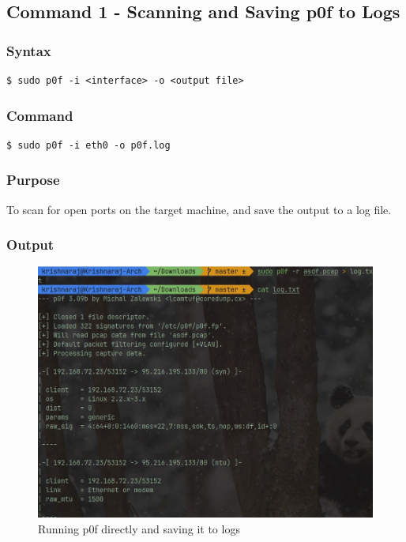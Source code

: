 \documentclass[11pt]{article}
\begin{document}
\subsection{Command 1 - Scanning and Saving p0f to Logs}

\subsubsection*{Syntax}
\begin{verbatim}
$ sudo p0f -i <interface> -o <output file>
\end{verbatim}

\subsubsection*{Command}
\begin{verbatim}
$ sudo p0f -i eth0 -o p0f.log
\end{verbatim}

\subsubsection*{Purpose}
To scan for open ports on the target machine, and save the output to a log file.

\subsubsection*{Output}

\begin{figure}[H]
    \centering
    \includegraphics[width=1.00\textwidth]{p0f/saving p0f to logs.jpg}
    \caption{Running p0f directly and saving it to logs}
\end{figure}
\end{document}
